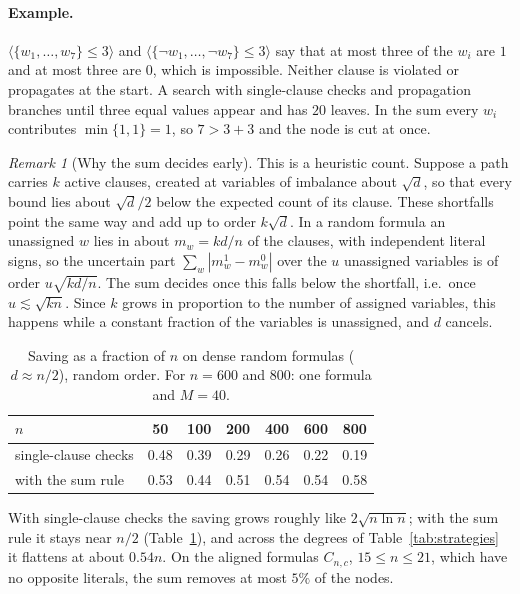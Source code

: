 \documentclass[11pt,a4paper]{article}
\theoremstyle{remark}
\newtheorem{remark}[theorem]{Remark}
\begin{document}
\paragraph{Example.} $\langle\{w_1,\dots,w_7\}\le3\rangle$ and
$\langle\{\neg w_1,\dots,\neg w_7\}\le3\rangle$ say that at most three of the
$w_i$ are $1$ and at most three are $0$, which is impossible. Neither clause is
violated or propagates at the start. A search with single-clause checks and
propagation branches until three equal values appear and has $20$ leaves. In
the sum every $w_i$ contributes $\min\{1,1\}=1$, so $7>3+3$ and the node is
cut at once.

\begin{remark}[Why the sum decides early]\label{rem:sum-heur}
This is a heuristic count. Suppose a path carries $k$ active clauses, created at
variables of imbalance about $\sqrt d$, so that every bound lies about
$\sqrt d/2$ below the expected count of its clause. These shortfalls point the
same way and add up to order $k\sqrt d$. In a random formula an unassigned $w$
lies in about $m_w=kd/n$ of the clauses, with independent literal signs, so the
uncertain part $\sum_w|m^1_w-m^0_w|$ over the $u$ unassigned variables is of
order $u\sqrt{kd/n}$. The sum decides once this falls below the shortfall,
i.e.\ once $u\lesssim\sqrt{kn}$. Since $k$ grows in proportion to the number
of assigned variables, this happens while a constant fraction of the
variables is unassigned, and $d$ cancels.
\end{remark}

\begin{table}[ht]
\centering
\begin{tabular}{lcccccc}
\toprule
$n$ & 50 & 100 & 200 & 400 & 600 & 800\\
\midrule
single-clause checks & 0.48 & 0.39 & 0.29 & 0.26 & 0.22 & 0.19\\
with the sum rule & 0.53 & 0.44 & 0.51 & 0.54 & 0.54 & 0.58\\
\bottomrule
\end{tabular}
\caption{Saving as a fraction of $n$ on dense random formulas ($d\approx
n/2$), random order. For $n=600$ and $800$: one formula and $M=40$.}
\label{tab:dense}
\end{table}

With single-clause checks the saving grows roughly like $2\sqrt{n\ln n}$; with the sum
rule it stays near $n/2$ (Table~\ref{tab:dense}), and across the degrees of
Table~\ref{tab:strategies} it flattens at about $0.54n$. On the aligned
formulas $C_{n,c}$, $15\le n\le21$, which have no opposite literals, the sum
removes at most $5\%$ of the nodes.
\end{document}
